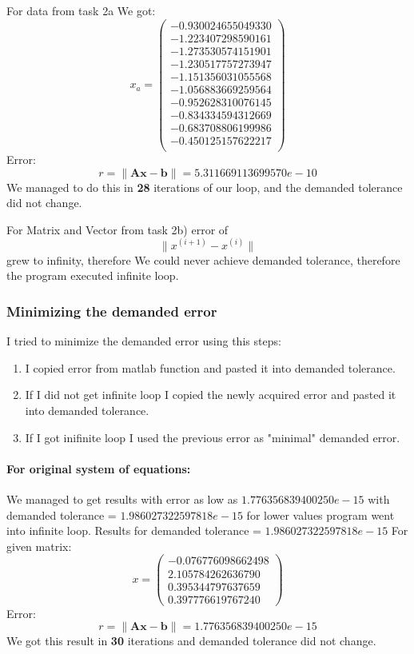 \documentclass[12pt]{report}
\begin{document}
For data from task 2a We got: \\
\[ x_a = \left( \begin{array}{cc}
-0.930024655049330 \\
-1.223407298590161 \\
-1.273530574151901 \\
-1.230517757273947 \\
-1.151356031055568 \\
-1.056883669259564 \\
-0.952628310076145 \\
-0.834334594312669 \\
-0.683708806199986 \\
-0.450125157622217 \\
\end{array} \right)
\]
Error:
\[ r = \| \mathbf{A}\mathbf{x} - \mathbf{b}\| = 5.311669113699570e-10 \]
We managed to do this in \textbf{28} iterations of our loop, and the demanded tolerance did not change.

For Matrix and Vector from task 2b) error of
\[ \| x^{(i+1)} - x^{(i)} \| \]
grew to infinity, therefore We could never achieve demanded tolerance, therefore the program executed infinite loop.

\subsubsection{Minimizing the demanded error}
I tried to minimize the demanded error using this steps:
\begin{enumerate}
\item I copied error from matlab function and pasted it into demanded tolerance.
\item If I did not get infinite loop I copied the newly acquired error and pasted it into demanded tolerance.
\item If I got inifinite loop I used the previous error as "minimal" demanded error.
\end{enumerate}
\paragraph{For original system of equations:}
We managed to get results with error as low as $1.776356839400250e-15$ with demanded tolerance = $ 1.986027322597818e-15 $ for lower values program went into infinite loop.
Results for demanded tolerance = $1.986027322597818e-15$
For given matrix:
\[ x = \left( \begin{array}{cc}
  -0.076776098662498 \\
   2.105784262636790 \\
   0.395344797637659 \\
   0.397776619767240
\end{array} \right)
\]
Error:
\[ r = \| \mathbf{A}\mathbf{x} - \mathbf{b}\| = 1.776356839400250e-15 \]
We got this result in \textbf{30} iterations and demanded tolerance did not change.
\end{document}
